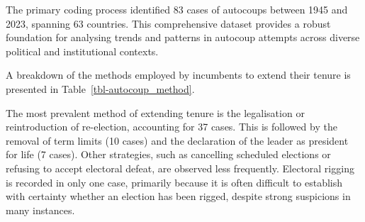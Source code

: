 \documentclass[
  12pt,
]{report}
\begin{document}
The primary coding process identified 83 cases of autocoups between 1945
and 2023, spanning 63 countries. This comprehensive dataset provides a
robust foundation for analysing trends and patterns in autocoup attempts
across diverse political and institutional contexts.

A breakdown of the methods employed by incumbents to extend their tenure
is presented in Table~\ref{tbl-autocoup_method}.

\begin{table}

\caption{\label{tbl-autocoup_method}Autocoup methods and success rates
(1945-2023)}


\end{table}%

The most prevalent method of extending tenure is the legalisation or
reintroduction of re-election, accounting for 37 cases. This is followed
by the removal of term limits (10 cases) and the declaration of the
leader as president for life (7 cases). Other strategies, such as
cancelling scheduled elections or refusing to accept electoral defeat,
are observed less frequently. Electoral rigging is recorded in only one
case, primarily because it is often difficult to establish with
certainty whether an election has been rigged, despite strong suspicions
in many instances.
\end{document}
